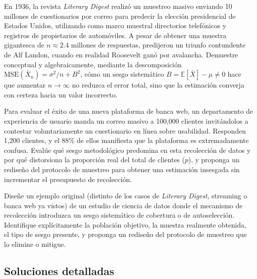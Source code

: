 \begin{problema}
	\label{prob:a5bddfb}
	En 1936, la revista \emph{Literary Digest} realizó un muestreo masivo enviando 10 millones de cuestionarios por correo para predecir la elección presidencial de Estados Unidos, utilizando como marco muestral directorios telefónicos y registros de propietarios de automóviles. A pesar de obtener una muestra gigantesca de $n \approx 2.4$ millones de respuestas, predijeron un triunfo contundente de Alf Landon, cuando en realidad Roosevelt ganó por avalancha. Demuestre conceptual y algebraicamente, mediante la descomposición $\text{MSE}(\bar{X}_n) = \sigma^2/n + B^2$, cómo un sesgo sistemático $B = \mathbb{E}[\bar{X}] - \mu \neq 0$ hace que aumentar $n \to \infty$ no reduzca el error total, sino que la estimación converja con certeza hacia un valor incorrecto.
\end{problema}

\begin{problema}
	\label{prob:feeec4c}
	Para evaluar el éxito de una nueva plataforma de banca web, un departamento de experiencia de usuario manda un correo masivo a 100,000 clientes invitándolos a contestar voluntariamente un cuestionario en línea sobre usabilidad. Responden 1,200 clientes, y el $88\%$ de ellos manifiesta que la plataforma es extremadamente confusa. Evalúe qué sesgo metodológico predomina en esta recolección de datos y por qué distorsiona la proporción real del total de clientes ($p$), y proponga un rediseño del protocolo de muestreo para obtener una estimación insesgada sin incrementar el presupuesto de recolección.
\end{problema}

\begin{problema}
	\label{prob:701b535}
	Diseñe un ejemplo original (distinto de los casos de \emph{Literary Digest}, streaming o banca web ya vistos) de un estudio de ciencia de datos donde el mecanismo de recolección introduzca un sesgo sistemático de cobertura o de autoselección. Identifique explícitamente la población objetivo, la muestra realmente obtenida, el tipo de sesgo presente, y proponga un rediseño del protocolo de muestreo que lo elimine o mitigue.
\end{problema}

\subsection*{Soluciones detalladas}

